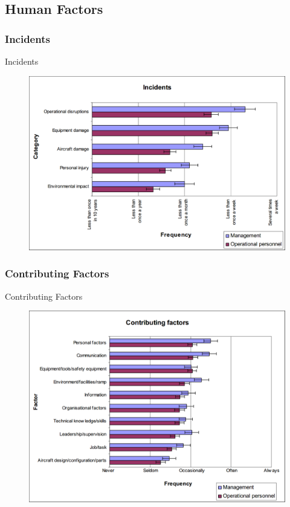 \subsection{Human Factors}

\subsubsection{Incidents}
\begin{frame}{Incidents}{}
	\begin{figure}[H]
	\centering
	\includegraphics[width=\textwidth]{Grafik/FrequencyOfIncidents}
\end{figure}
\end{frame}

\subsubsection{Contributing Factors}
\begin{frame}{Contributing Factors}{}
	\begin{figure}[H]
	\centering
	\includegraphics[width=\textwidth]{Grafik/ContributingFactors}
\end{figure}
\end{frame}

